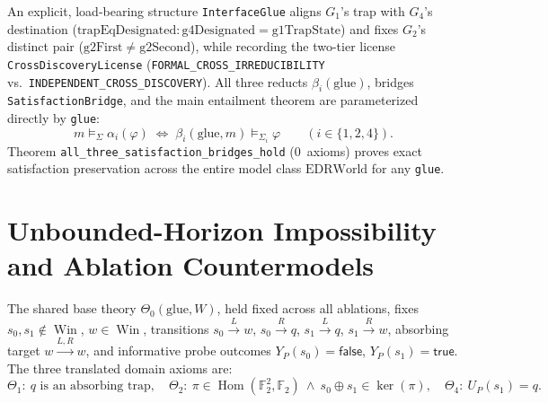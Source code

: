 \documentclass[10pt,a4paper]{article}
\theoremstyle{cleanthm}
\theoremstyle{cleandef}
\DeclareMathOperator{\Win}{Win}
\DeclareMathOperator{\Hom}{Hom}
\begin{document}
An explicit, load-bearing structure \texttt{InterfaceGlue} aligns $G_1$'s trap with $G_4$'s destination ($\mathrm{trapEqDesignated}:\mathrm{g4Designated}=\mathrm{g1TrapState}$) and fixes $G_2$'s distinct pair ($\mathrm{g2First}\ne\mathrm{g2Second}$), while recording the two-tier license \texttt{CrossDiscoveryLicense} (\texttt{FORMAL\_\allowbreak CROSS\_\allowbreak IRREDUCIBILITY} vs.\ \texttt{INDEPENDENT\_\allowbreak CROSS\_\allowbreak DISCOVERY}). All three reducts $\beta_i(\mathrm{glue})$, bridges \texttt{Satisfaction\allowbreak Bridge}, and the main entailment theorem are parameterized directly by \texttt{glue}:
\begin{equation}
  m\models_\Sigma \alpha_i(\varphi) \;\iff\; \beta_i(\mathrm{glue},m)\models_{\Sigma_i} \varphi \qquad (i\in\{1,2,4\}).
\end{equation}
Theorem \texttt{all\_\allowbreak three\_\allowbreak satisfaction\_\allowbreak bridges\_\allowbreak hold} (0~axioms) proves exact satisfaction preservation across the entire model class $\mathrm{EDRWorld}$ for any \texttt{glue}.

\section{Unbounded-Horizon Impossibility and Ablation Countermodels}

The shared base theory $\Theta_0(\mathrm{glue},W)$, held fixed across all ablations, fixes $s_0,s_1\notin\Win$, $w\in\Win$, transitions $s_0\xrightarrow{L}w$, $s_0\xrightarrow{R}q$, $s_1\xrightarrow{L}q$, $s_1\xrightarrow{R}w$, absorbing target $w\xrightarrow{L,R}w$, and informative probe outcomes $Y_P(s_0)=\mathsf{false}$, $Y_P(s_1)=\mathsf{true}$. The three translated domain axioms are:
\begin{equation}
  \Theta_1:\ q\text{ is an absorbing trap},\quad
  \Theta_2:\ \pi\in\Hom(\mathbb{F}_2^2,\mathbb{F}_2)\ \land\ s_0\oplus s_1\in\ker(\pi),\quad
  \Theta_4:\ U_P(s_1)=q.
\end{equation}
\end{document}
